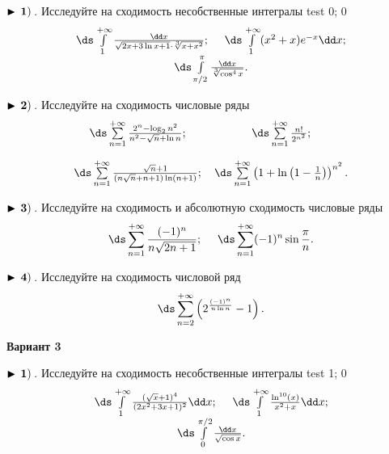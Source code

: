 $\bf\blacktriangleright\,1)\,$. Исследуйте на сходимость несобственные интегралы test 0; 0
\begin{equation*}
\begin{array}{cc}
  \,\ds\int\limits_{1}^{+\infty} \frac{\dd x}{\sqrt{2x+3\ln x +1}\cdot\sqrt[3]{x+x^2}}

  ;\quad\,    \,
\ds\int\limits_{1}^{+\infty} (x^2+x)e^{-x}\dd x

  ;\\
  \,
\ds\int\limits_{\pi/2}^{\pi}\frac{\dd x}{\sqrt[3]{\cos^4 x}}

  .
\end{array}
\end{equation*}


$\bf\blacktriangleright\,2)\,$. Исследуйте на сходимость числовые ряды
\begin{equation*}
    \begin{array}{ccc}
        \,\ds\sum\limits_{n=1}^{+\infty}\frac{2^n-\log_2 n^2}{n^2-\sqrt{n}+\ln n}

        ; &   \,
\ds\sum\limits_{n=1}^{+\infty}\frac{n!}{2^{n^2}}

        ; \\[6mm]
        \,
\ds\sum\limits_{n=1}^{+\infty}\frac{\sqrt{n}+1}{(n\sqrt{n}+n+1)\ln (n+1)}

        ; &    \,
\ds\sum\limits_{n=1}^{+\infty}\left(1+\ln\left(1-\frac{1}{n}\right)\right)^{n^2}
        .
    \end{array}
\end{equation*}


$\bf\blacktriangleright\,3)\,$. Исследуйте на сходимость и абсолютную сходимость числовые ряды
\begin{equation*}
    \,
\ds\sum\limits_{n=1}^{+\infty}\frac{(-1)^n}{n\sqrt{2n+1}}

    ;\quad\,   \,
\ds\sum\limits_{n=1}^{+\infty}(-1)^n\sin\frac{\pi}{n}

    .
\end{equation*}


$\bf\blacktriangleright\,4)\,$. Исследуйте на сходимость числовой ряд
\begin{equation*}
    \,\ds\sum\limits_{n=2}^{+\infty}\left(2^{\frac{(-1)^n}{n\ln n}}-1\right)

    .
\end{equation*}

\centerline{\bf\Large Вариант 3}


$\bf\blacktriangleright\,1)\,$. Исследуйте на сходимость несобственные интегралы test 1; 0
\begin{equation*}
\begin{array}{cc}
  \,
\ds\int\limits_{1}^{+\infty} \frac{(\sqrt{x}+1)^4}{(2x^2+3x+1)^2}\dd x

  ;\quad\,    \,
\ds\int\limits_{1}^{+\infty} \frac{\ln^{10}(x)}{x^2+x}\dd x

  ;\\
  \,
\ds\int\limits_{0}^{\pi/2}\frac{\dd x}{\sqrt{\cos x}}

  .
\end{array}
\end{equation*}


